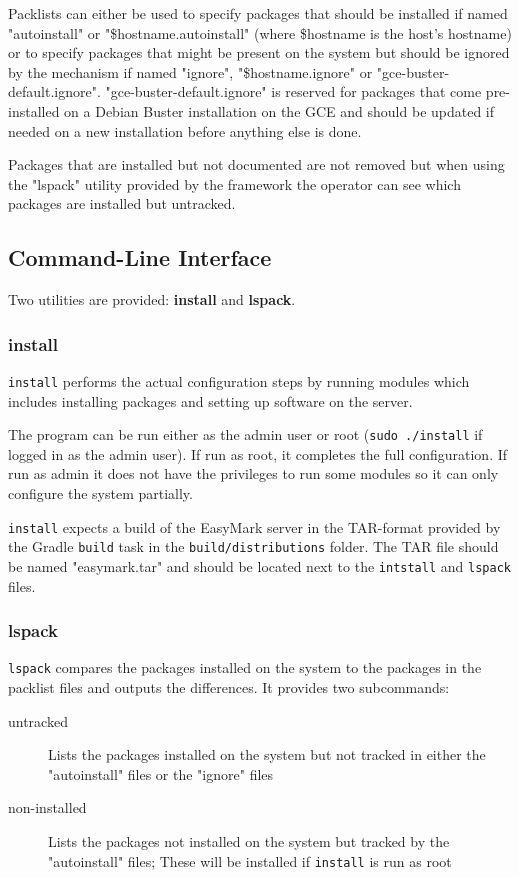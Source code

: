 \documentclass[12pt,a4paper,oneside]{report}
\begin{document}
	Packlists can either be used to specify packages that should be installed if named "autoinstall" or "\$hostname.autoinstall" (where \$hostname is the host's hostname) or to specify packages that might be present on the system but should be ignored by the mechanism if named "ignore", "\$hostname.ignore" or "gce-buster-default.ignore". "gce-buster-default.ignore" is reserved for packages that come pre-installed on a Debian Buster installation on the GCE and should be updated if needed on a new installation before anything else is done.

	Packages that are installed but not documented are not removed but when using the "lspack" utility provided by the framework the operator can see which packages are installed but untracked.

	\subsection{Command-Line Interface}
	Two utilities are provided: \textbf{install} and \textbf{lspack}.

	\subsubsection{install}
	\lstinline|install| performs the actual configuration steps by running modules which includes installing packages and setting up software on the server.

	\pagebreak
	The program can be run either as the admin user or root (\lstinline|sudo ./install| if logged in as the admin user). If run as root, it completes the full configuration. If run as admin it does not have the privileges to run some modules so it can only configure the system partially.

	\lstinline|install| expects a build of the EasyMark server in the TAR-format provided by the Gradle \lstinline|build| task in the \lstinline|build/distributions| folder. The TAR file should be named "easymark.tar" and should be located next to the \lstinline|intstall| and \lstinline|lspack| files.

	\subsubsection{lspack}
	\lstinline|lspack| compares the packages installed on the system to the packages in the packlist files and outputs the differences. It provides two subcommands:

	\begin{description}
		\item[untracked] Lists the packages installed on the system but not tracked in either the "autoinstall" files or the "ignore" files
		\item[non-installed] Lists the packages not installed on the system but tracked by the "autoinstall" files; These will be installed if \lstinline|install| is run as root
	\end{description}
\end{document}
